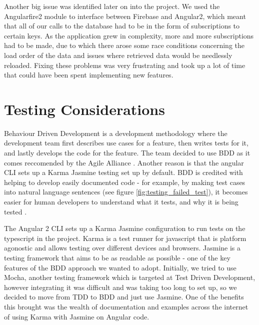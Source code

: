 \documentclass{l3proj}
\begin{document}
Another big issue was identified later on into the project. We used the
 Angularfire2 module to interface between Firebase and Angular2, which meant
 that all of our calls to the database had to be in the form of subscriptions
 to certain keys. As the application grew in complexity, more and more 
 subscriptions had to be made, due to which there arose some race conditions 
 concerning the load order of the data and issues where retrieved data would 
 be needlessly reloaded. Fixing these problems was very frustrating and took 
 up a lot of time that could have been spent implementing new features.

\section{Testing Considerations} %
\label{sec:testing}

Behaviour Driven Development is a development methodology where the development team
 first describes use cases for a feature, then writes tests for it, and lastly
 develops the code for the feature. The team decided to use BDD as it comes
 reccomended by the Agile Alliance \cite{agilealliance_bdd}. Another reason
 is that the angular CLI sets up a Karma Jasmine testing set up by default.
 BDD is credited with helping to develop easily documented code - for example,
 by making test cases into natural language sentences (see figure
 \ref{fig:testing_failed_test}), it becomes easier for human developers to
 understand what it tests, and why it is being tested \cite{north2006bdd}.

 

The Angular 2 CLI sets up a Karma Jasmine configuration to run tests on
 the typescript in the project. Karma is a test runner for javascript
 that is platform agonostic and allows testing over different devices
 and browsers\cite{jina2013javascript}. Jasmine is a testing framework 
 that aims to be as readable as possible - one of the key features of 
 the BDD approach we wanted to adopt. Initially, we tried to use Mocha, 
 another testing framework which is targeted at Test Driven Development,
 however integrating it was difficult and was taking too long to set up, 
 so we decided to move from TDD to BDD and just use Jasmine. One of the 
 benefits this brought was the wealth of documentation and examples 
 across the internet of using Karma with Jasmine on Angular code.
\end{document}

